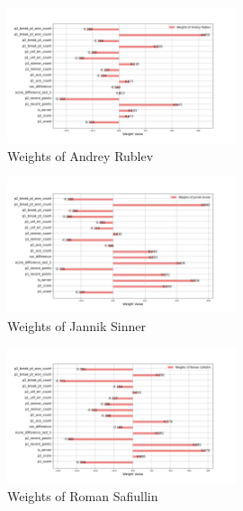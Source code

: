 \documentclass[UTF8]{ctexart} %
\begin{document}
\begin{figure}[H]
    \centering
    \includegraphics[width=0.6\textwidth]{./graph/Andrey.png}
    \caption{Weights of Andrey Rublev}
\end{figure}

\begin{figure}[H]
    \centering
    \includegraphics[width=0.6\textwidth]{./graph/Jannik.png}
    \caption{Weights of Jannik Sinner}
\end{figure}

\begin{figure}[H]
    \centering
    \includegraphics[width=0.6\textwidth]{./graph/Roman.png}
    \caption{Weights of Roman Safiullin}
\end{figure}
\end{document}
